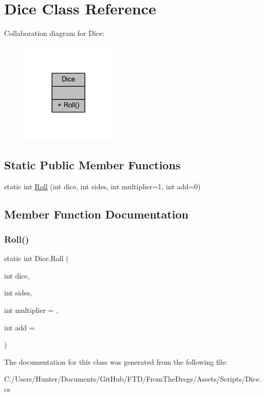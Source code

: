 \hypertarget{class_dice}{}\section{Dice Class Reference}
\label{class_dice}


Collaboration diagram for Dice\+:
\nopagebreak
\begin{figure}[H]
\begin{center}
\leavevmode
\includegraphics[width=128pt]{class_dice__coll__graph}
\end{center}
\end{figure}
\subsection*{Static Public Member Functions}
\begin{DoxyCompactItemize}
\item 
static int \mbox{\hyperlink{class_dice_a35ef280974d277d579faaec918e8cecc}{Roll}} (int dice, int sides, int multiplier=1, int add=0)
\end{DoxyCompactItemize}


\subsection{Member Function Documentation}
\mbox{\label{class_dice_a35ef280974d277d579faaec918e8cecc}} 
\subsubsection{\texorpdfstring{Roll()}{Roll()}}
{\footnotesize\ttfamily static int Dice.\+Roll (\begin{DoxyParamCaption}\item[{int}]{dice,  }\item[{int}]{sides,  }\item[{int}]{multiplier = {},  }\item[{int}]{add = {} }\end{DoxyParamCaption})\hspace{0.3cm}{\ttfamily [static]}}



The documentation for this class was generated from the following file\+:\begin{DoxyCompactItemize}
\item 
C\+:/\+Users/\+Hunter/\+Documents/\+Git\+Hub/\+F\+T\+D/\+From\+The\+Dregs/\+Assets/\+Scripts/Dice.\+cs\end{DoxyCompactItemize}
